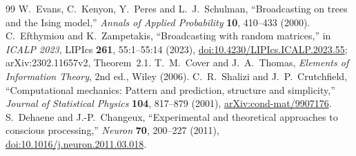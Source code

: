 \documentclass[11pt,a4paper]{article}
\begin{document}
\begin{thebibliography}{99}
 W.~Evans, C.~Kenyon, Y.~Peres and L.~J.~Schulman, ``Broadcasting on trees and the Ising model,'' \emph{Annals of Applied Probability} \textbf{10}, 410--433 (2000).
 C.~Efthymiou and K.~Zampetakis, ``Broadcasting with random matrices,'' in \emph{ICALP 2023}, LIPIcs \textbf{261}, 55:1--55:14 (2023), \href{https://doi.org/10.4230/LIPIcs.ICALP.2023.55}{doi:10.4230/LIPIcs.ICALP.2023.55}; arXiv:2302.11657v2, Theorem~2.1.
 T.~M.~Cover and J.~A.~Thomas, \emph{Elements of Information Theory}, 2nd ed., Wiley (2006).
 C.~R.~Shalizi and J.~P.~Crutchfield, ``Computational mechanics: Pattern and prediction, structure and simplicity,'' \emph{Journal of Statistical Physics} \textbf{104}, 817--879 (2001), \href{https://arxiv.org/abs/cond-mat/9907176}{arXiv:cond-mat/9907176}.
 S.~Dehaene and J.-P.~Changeux, ``Experimental and theoretical approaches to conscious processing,'' \emph{Neuron} \textbf{70}, 200--227 (2011), \href{https://doi.org/10.1016/j.neuron.2011.03.018}{doi:10.1016/j.neuron.2011.03.018}.
\end{thebibliography}
\end{document}
